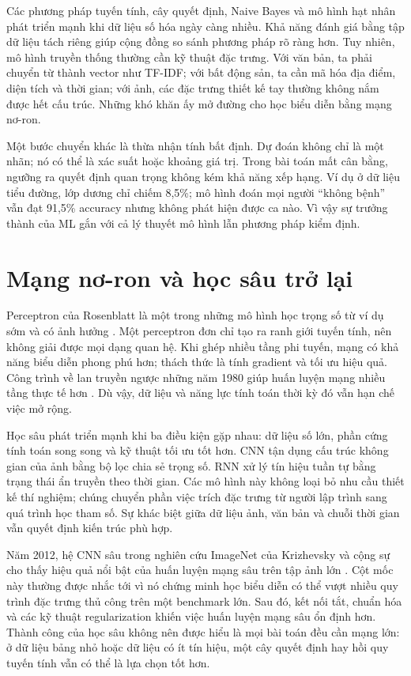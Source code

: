 \documentclass[12pt,a4paper]{report}
\begin{document}
Các phương pháp tuyến tính, cây quyết định, Naive Bayes và mô hình hạt nhân phát triển mạnh khi dữ liệu số hóa ngày càng nhiều. Khả năng đánh giá bằng tập dữ liệu tách riêng giúp cộng đồng so sánh phương pháp rõ ràng hơn. Tuy nhiên, mô hình truyền thống thường cần kỹ thuật đặc trưng. Với văn bản, ta phải chuyển từ thành vector như TF-IDF; với bất động sản, ta cần mã hóa địa điểm, diện tích và thời gian; với ảnh, các đặc trưng thiết kế tay thường không nắm được hết cấu trúc. Những khó khăn ấy mở đường cho học biểu diễn bằng mạng nơ-ron.

Một bước chuyển khác là thừa nhận tính bất định. Dự đoán không chỉ là một nhãn; nó có thể là xác suất hoặc khoảng giá trị. Trong bài toán mất cân bằng, ngưỡng ra quyết định quan trọng không kém khả năng xếp hạng. Ví dụ ở dữ liệu tiểu đường, lớp dương chỉ chiếm 8,5\%; mô hình đoán mọi người ``không bệnh'' vẫn đạt 91,5\% accuracy nhưng không phát hiện được ca nào. Vì vậy sự trưởng thành của ML gắn với cả lý thuyết mô hình lẫn phương pháp kiểm định.

\section{Mạng nơ-ron và học sâu trở lại}
Perceptron của Rosenblatt là một trong những mô hình học trọng số từ ví dụ sớm và có ảnh hưởng \cite{rosenblatt1958}. Một perceptron đơn chỉ tạo ra ranh giới tuyến tính, nên không giải được mọi dạng quan hệ. Khi ghép nhiều tầng phi tuyến, mạng có khả năng biểu diễn phong phú hơn; thách thức là tính gradient và tối ưu hiệu quả. Công trình về lan truyền ngược những năm 1980 giúp huấn luyện mạng nhiều tầng thực tế hơn \cite{rumelhart1986}. Dù vậy, dữ liệu và năng lực tính toán thời kỳ đó vẫn hạn chế việc mở rộng.

Học sâu phát triển mạnh khi ba điều kiện gặp nhau: dữ liệu số lớn, phần cứng tính toán song song và kỹ thuật tối ưu tốt hơn. CNN tận dụng cấu trúc không gian của ảnh bằng bộ lọc chia sẻ trọng số. RNN xử lý tín hiệu tuần tự bằng trạng thái ẩn truyền theo thời gian. Các mô hình này không loại bỏ nhu cầu thiết kế thí nghiệm; chúng chuyển phần việc trích đặc trưng từ người lập trình sang quá trình học tham số. Sự khác biệt giữa dữ liệu ảnh, văn bản và chuỗi thời gian vẫn quyết định kiến trúc phù hợp.

Năm 2012, hệ CNN sâu trong nghiên cứu ImageNet của Krizhevsky và cộng sự cho thấy hiệu quả nổi bật của huấn luyện mạng sâu trên tập ảnh lớn \cite{alexnet2012}. Cột mốc này thường được nhắc tới vì nó chứng minh học biểu diễn có thể vượt nhiều quy trình đặc trưng thủ công trên một benchmark lớn. Sau đó, kết nối tắt, chuẩn hóa và các kỹ thuật regularization khiến việc huấn luyện mạng sâu ổn định hơn. Thành công của học sâu không nên được hiểu là mọi bài toán đều cần mạng lớn: ở dữ liệu bảng nhỏ hoặc dữ liệu có ít tín hiệu, một cây quyết định hay hồi quy tuyến tính vẫn có thể là lựa chọn tốt hơn.
\end{document}
